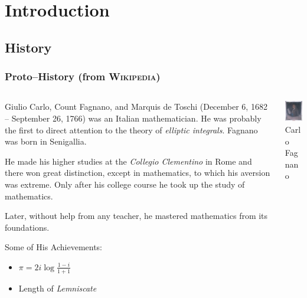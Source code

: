 \documentclass[10pt,handout]{beamer} %
\date{April 13, 2015}
\title[Elliptic curves over $\F_{q}$]{\insertlecture}
\subtitle{First steps}
\begin{document}
\begin{frame}
\titlepage
\end{frame}

\section{Introduction}


\subsection{History}

\begin{frame}\frametitle{Proto--History (from \textsc{Wikipedia})}

\begin{columns}[c]
\begin{column}{6cm}\begin{small}
Giulio Carlo, Count Fagnano, and Marquis de Toschi (December 6, 1682 -- September 26, 1766)
was an Italian mathematician. He was probably the first to direct attention to the theory of
\emph{elliptic integrals}. Fagnano was born in Senigallia.\medskip

He made his higher studies at the \emph{Collegio Clementino} in Rome and there won great distinction,
except in mathematics, to which his aversion was extreme. Only after his college course he took up the study of
mathematics.\medskip

Later, without help from any teacher, he mastered mathematics from its foundations.\end{small}
\begin{block}{Some of His Achievements:}
\begin{itemize}
 \item $\pi=2i\log\frac{1-i}{1+1}$
 \item Length of \emph{Lemniscate}
\end{itemize}
\end{block}
\end{column}
\begin{column}{4cm}
\includegraphics[width=2.5cm]{images/fagnano.jpg}\\
\scriptsize{Carlo Fagnano}
\bigskip


\end{column}
\end{columns}
\end{frame}
\end{document}
